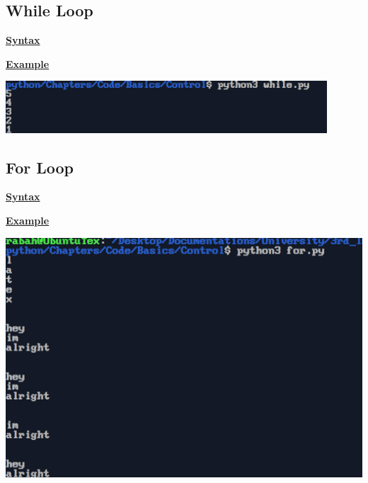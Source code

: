 \newpage
\subsection{While Loop}
\textbf{\underline{Syntax}}\\[0.1cm]



\vspace{0.8cm}

\textbf{\underline{Example}}\\[0.1cm]


\vspace{0.35cm}
\begin{center}
    \includegraphics[width = 0.9\textwidth]{Chapters/ScreenShot/Basics/Control/whileOutput.png}
\end{center}

\vspace{1cm}
\subsection{For Loop}
\textbf{\underline{Syntax}}\\[0.1cm]



\newpage

\textbf{\underline{Example}}\\[0.1cm]


\vspace{0.35cm}
\begin{center}
    \includegraphics[height = 0.4\textheight]{Chapters/ScreenShot/Basics/Control/forOutput.png}
\end{center}

